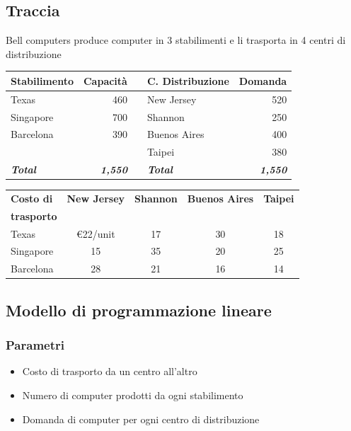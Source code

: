 \subsection{Traccia}
Bell computers produce computer in 3 stabilimenti e li trasporta in 4 centri di distribuzione

\begin{center}
    \begin{tabular}{|l|r|c|l|r|}
    \hline
    \textbf{Stabilimento} & \textbf{Capacità} & \quad & \textbf{C. Distribuzione} & \textbf{Domanda} \\ \hline
    Texas & 460 & & New Jersey & 520 \\ \hline
    Singapore & 700 & & Shannon & 250 \\ \hline
    Barcelona & 390 & & Buenos Aires & 400 \\ \hline
     & & & Taipei & 380 \\ \hline
    \textit{\textbf{Total}} & \textit{\textbf{1,550}} & & \textit{\textbf{Total}} & \textit{\textbf{1,550}} \\ \hline
    \end{tabular}
    
    \bigskip
    
    \begin{tabular}{|l|c|c|c|c|}
    \hline
    \textbf{Costo di} & \textbf{New Jersey} & \textbf{Shannon} & \textbf{Buenos Aires} & \textbf{Taipei} \\
    \textbf{trasporto} & & & & \\ \hline
    Texas & €22/unit & 17 & 30 & 18 \\ \hline
    Singapore & 15 & 35 & 20 & 25 \\ \hline
    Barcelona & 28 & 21 & 16 & 14 \\ \hline
    \end{tabular}
\end{center}

\subsection{Modello di programmazione lineare}

\subsubsection{Parametri}
\begin{itemize}
    \item Costo di trasporto da un centro all'altro
    \item Numero di computer prodotti da ogni stabilimento
    \item Domanda di computer per ogni centro di distribuzione
\end{itemize}

